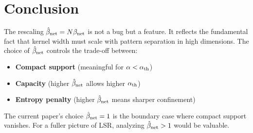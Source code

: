 \documentclass[11pt]{article}
\newcommand{\bnet}{\beta_{\rm net}}
\newcommand{\bhat}{\hat{\beta}_{\rm net}}
\begin{document}
\section{Conclusion}

The rescaling $\bhat = N\bnet$ is not a bug but a feature. It reflects the fundamental fact that kernel width must scale with pattern separation in high dimensions. The choice of $\bhat$ controls the trade-off between:

\begin{itemize}
    \item \textbf{Compact support} (meaningful for $\alpha < \alpha_{\rm th}$)
    \item \textbf{Capacity} (higher $\bhat$ allows higher $\alpha_{\rm th}$)
    \item \textbf{Entropy penalty} (higher $\bhat$ means sharper confinement)
\end{itemize}

The current paper's choice $\bhat = 1$ is the boundary case where compact support vanishes. For a fuller picture of LSR, analyzing $\bhat > 1$ would be valuable.
\end{document}
